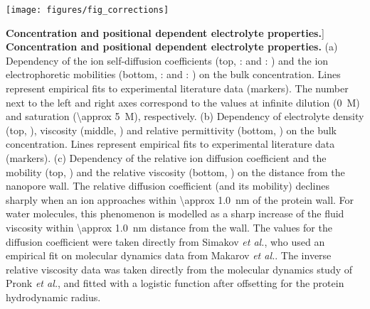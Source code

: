 
\begin{figure*}[b]

\centering

\texttt{[image: figures/fig\_corrections]}

\caption
[\textbf{Concentration and positional dependent electrolyte properties.}]
{
\textbf{Concentration and positional dependent electrolyte properties.}
(a) Dependency of the ion self-diffusion coefficients (top, :  and : ) and the ion electrophoretic mobilities (bottom, :  and : ) on the bulk  concentration. Lines represent empirical fits to experimental literature data (markers). The number next to the left and right axes correspond to the values at infinite dilution (\SI{0}{M}) and saturation (\SI{\approx 5}{M}), respectively.
(b) Dependency of electrolyte density (top, ), viscosity (middle, ) and relative permittivity (bottom, ) on the bulk  concentration. Lines represent empirical fits to experimental literature data (markers).
(c) Dependency of the relative ion diffusion coefficient and the mobility (top, ) and the relative viscosity (bottom, ) on the distance from the nanopore wall. The relative diffusion coefficient (and its mobility) declines sharply when an ion approaches within \SI{\approx 1.0}{\nm} of the protein wall. For water molecules, this phenomenon is modelled as a sharp increase of the fluid viscosity within \SI{\approx 1.0}{\nm} distance from the wall.
The values for the diffusion coefficient were taken directly from Simakov \textit{et al.}\cite{simakov2010}, who used an empirical fit on molecular dynamics data from Makarov \textit{et al.}\cite{makarov1998}. The inverse relative viscosity data was taken directly from the molecular dynamics study of Pronk \textit{et al.}\cite{pronk2013}, and fitted with a logistic function after offsetting for the protein hydrodynamic radius.
}

\label{fig:corrections}

\end{figure*}

